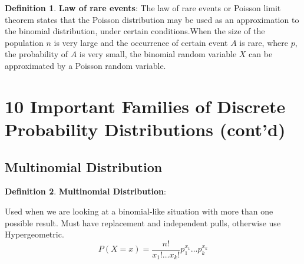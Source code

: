 \documentclass[12pt]{amsart}
\theoremstyle{definition}
\newtheorem{definition}{Definition} %
\numberwithin{equation}{theorem}    %
\begin{document}
\begin{definition}
    \textbf{Law of rare events}:
    The law of rare events or Poisson limit theorem states that the Poisson distribution may be used as an approximation to the binomial distribution, under certain conditions.When the size of the population $n$ is very large and the occurrence of certain event $A$ is rare, where $p$, the probability of $A$ is very small, the binomial random variable $X$ can be approximated by a Poisson random variable.
\end{definition}

\section*{10 Important Families of Discrete Probability Distributions (cont’d)}


\subsection*{Multinomial Distribution}

\begin{definition}
    \textbf{Multinomial Distribution}:

\end{definition}
    Used when we are looking at a binomial-like situation with more than one possible result. Must have replacement and independent pulls, otherwise use Hypergeometric.
    $$P(X=x) =\frac{n!}{x_1!\ldots x_k!}p_1^{x_1}\ldots p_k^{x_k}$$
\end{document}
